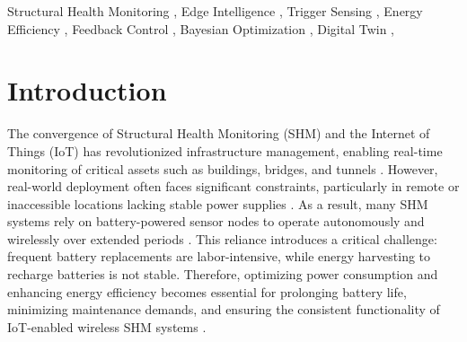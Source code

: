 \documentclass[a4paper,fleqn,numbers,sort&compress]{cas-sc}
\begin{document}


\begin{keywords}
  Structural Health Monitoring \sep 
  Edge Intelligence \sep 
  Trigger Sensing \sep
  Energy Efficiency \sep
  Feedback Control \sep 
  Bayesian Optimization \sep
  Digital Twin \sep
\end{keywords}

\maketitle

\section{Introduction}
\label{sec:intro}

The convergence of Structural Health Monitoring (SHM) and the Internet of Things (IoT) has revolutionized infrastructure management, enabling real-time monitoring of critical assets such as buildings, bridges, and tunnels \citep{yu_recent_2023}. However, real-world deployment often faces significant constraints, particularly in remote or inaccessible locations lacking stable power supplies \citep{fu_suddenevent_2019}. As a result, many SHM systems rely on battery-powered sensor nodes to operate autonomously and wirelessly over extended periods \citep{lea_iot_2020}. This reliance introduces a critical challenge: frequent battery replacements are labor-intensive, while energy harvesting to recharge batteries is not stable. Therefore, optimizing power consumption and enhancing energy efficiency becomes essential for prolonging battery life, minimizing maintenance demands, and ensuring the consistent functionality of IoT-enabled wireless SHM systems \citep{fu_sudden_2018, laflamme_roadmap_2023}.
\end{document}
